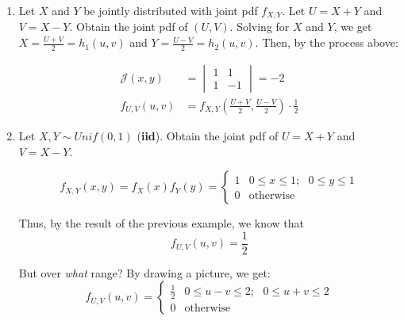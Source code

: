 \documentclass{article}
\begin{document}
\begin{enumerate}
    \item Let $X$ and $Y$ be jointly distributed with joint pdf $f_{X,Y}$. Let $U = X + Y$ and $V = X - Y$. Obtain the joint pdf of $(U,V)$. Solving for $X$ and $Y$, we get $X = \frac{U+V}{2} = h_1(u,v)$ and $Y=\frac{U-V}{2} = h_2(u,v)$. Then, by the process above:
    
    \begin{equation*}
        \begin{split}
            \mathcal{J} (x,y) &= \begin{vmatrix}
                1 & 1\\
                1 & -1
            \end{vmatrix} = -2\\
            f_{U,V}(u,v) &= f_{X,Y}\left(\frac{U+V}{2}, \frac{U-V}{2} \right) \cdot \frac{1}{2}
        \end{split}
    \end{equation*}
    
    \item Let $X,Y \sim Unif(0,1)$ (\textbf{iid}). Obtain the joint pdf of $U = X + Y$ and $V = X-Y$.
    
    \begin{equation*}
        f_{X,Y}(x,y) = f_X(x) f_Y(y) = \begin{cases}
                                            1 & 0 \leq x \leq 1; \text{ } 0 \leq y \leq 1\\
                                            0 & \text{otherwise}
                                        \end{cases}
    \end{equation*}
    
    Thus, by the result of the previous example, we know that
    \begin{equation*}
        f_{U,V}(u,v) = \frac{1}{2}
    \end{equation*}
    
    But over \textit{what} range? By drawing a picture, we get:
    \begin{equation*}
        f_{U,V}(u,v) = \begin{cases}
                        \frac{1}{2} & 0\leq u - v \leq 2; \text{ } 0 \leq u + v \leq 2\\
                        0 & \text{otherwise}
            \end{cases}
    \end{equation*}
    

\end{enumerate}
\end{document}
